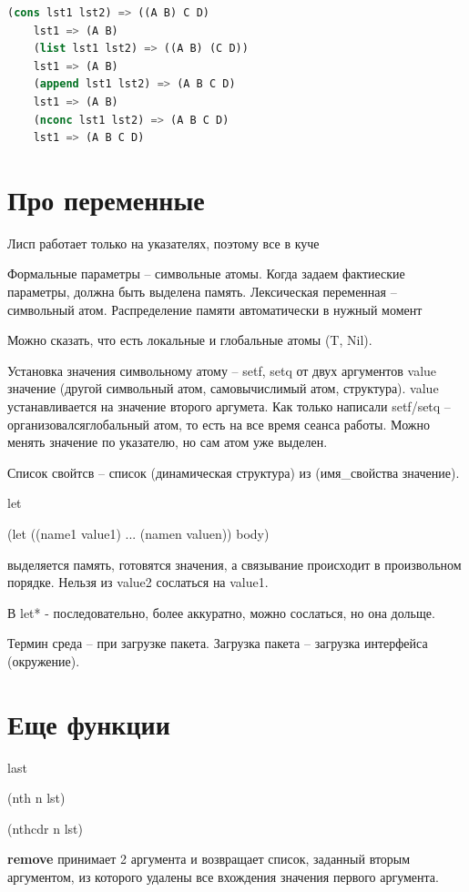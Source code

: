 \documentclass[12pt]{report}
\begin{document}
\begin{lstlisting}[language=Lisp]	
	(cons lst1 lst2) => ((A B) C D)
	lst1 => (A B)
	(list lst1 lst2) => ((A B) (C D))
	lst1 => (A B)
	(append lst1 lst2) => (A B C D)
	lst1 => (A B)
	(nconc lst1 lst2) => (A B C D)
	lst1 => (A B C D)
\end{lstlisting}



\section*{Про переменные}

Лисп работает только на указателях, поэтому все в куче

Формальные параметры -- символьные атомы. Когда задаем фактиеские параметры, должна быть выделена память. Лексическая переменная -- символьный атом. Распределение памяти автоматически в нужный момент

Можно сказать, что есть локальные и глобальные атомы (T, Nil).

Установка значения символьному атому -- setf, setq от двух аргументов value значение (другой символьный атом, самовычислимый атом, структура). value устанавливается на значение второго аргумета. Как только написали setf/setq -- организовалсяглобальный атом, то есть на все время сеанса работы. Можно менять значение по указателю, но сам атом уже выделен.

Список свойтсв -- список (динамическая структура) из (имя\_свойства значение).

let

(let ((name1 value1) ... (namen valuen)) body)

выделяется память, готовятся значения, а связывание происходит в произвольном порядке. Нельзя из value2 сослаться на value1.

В let* - последовательно, более аккуратно, можно сослаться, но она дольще.

Термин среда -- при загрузке пакета. Загрузка пакета -- загрузка интерфейса (окружение).

\section*{Еще функции}

last

(nth n lst)

(nthcdr n lst)

\textbf{remove} принимает 2 аргумента и возвращает список, заданный вторым аргументом, из которого удалены все вхождения значения первого аргумента.
\end{document}
